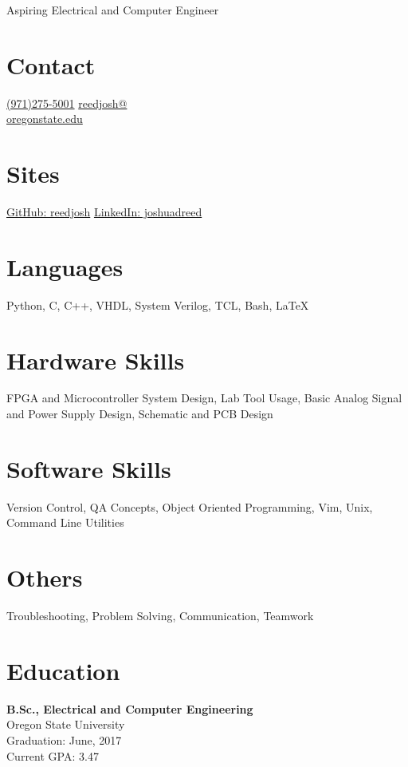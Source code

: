 \documentclass[]{friggeri-cv}
\begin{document}
       {Aspiring Electrical and Computer Engineer}


\begin{aside}
  \section{Contact}
    \href{tel:19712755001}{(971)275-5001}
    \href{mailto:reedjosh@oregonstate.edu}{reedjosh@\\oregonstate.edu}
  \section{Sites}
    \href{https://github.com/reedjosh}{GitHub: reedjosh}
    \href{https://www.linkedin.com/in/joshuadreed}{LinkedIn: joshuadreed}
  \section{Languages}
    Python, C, C++, VHDL, System Verilog, TCL, Bash, \LaTeX
  \section{Hardware Skills}
    FPGA and Microcontroller System Design,  Lab Tool Usage,  Basic Analog Signal and Power Supply Design, Schematic and PCB Design
  \section{Software Skills}
    Version Control, QA Concepts,
    Object Oriented Programming, Vim, Unix, Command Line Utilities
  \section{Others} Troubleshooting, Problem Solving, Communication, Teamwork
\end{aside}



\section{Education}

    \textbf{B.Sc., Electrical and Computer Engineering} \\
    Oregon State University \\
    Graduation: June, 2017 \\
    Current GPA: 3.47
\end{document}
